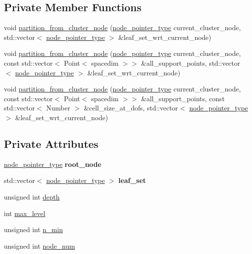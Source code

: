 \subsection*{Private Member Functions}
\begin{DoxyCompactItemize}
\item 
void \hyperlink{classClusterTree_a8b650f0c7cc83adbde5aad9556a57ac3}{partition\+\_\+from\+\_\+cluster\+\_\+node} (\hyperlink{classClusterTree_ae4bb0fdc7ac559d7844d04a00ab3e9de}{node\+\_\+pointer\+\_\+type} current\+\_\+cluster\+\_\+node, std\+::vector$<$ \hyperlink{classClusterTree_ae4bb0fdc7ac559d7844d04a00ab3e9de}{node\+\_\+pointer\+\_\+type} $>$ \&leaf\+\_\+set\+\_\+wrt\+\_\+current\+\_\+node)
\item 
void \hyperlink{classClusterTree_a6d3636b1686d72909611a6d516f5ee47}{partition\+\_\+from\+\_\+cluster\+\_\+node} (\hyperlink{classClusterTree_ae4bb0fdc7ac559d7844d04a00ab3e9de}{node\+\_\+pointer\+\_\+type} current\+\_\+cluster\+\_\+node, const std\+::vector$<$ Point$<$ spacedim $>$$>$ \&all\+\_\+support\+\_\+points, std\+::vector$<$ \hyperlink{classClusterTree_ae4bb0fdc7ac559d7844d04a00ab3e9de}{node\+\_\+pointer\+\_\+type} $>$ \&leaf\+\_\+set\+\_\+wrt\+\_\+current\+\_\+node)
\item 
void \hyperlink{classClusterTree_a8b853c36834044df5283fca9e03d39d2}{partition\+\_\+from\+\_\+cluster\+\_\+node} (\hyperlink{classClusterTree_ae4bb0fdc7ac559d7844d04a00ab3e9de}{node\+\_\+pointer\+\_\+type} current\+\_\+cluster\+\_\+node, const std\+::vector$<$ Point$<$ spacedim $>$$>$ \&all\+\_\+support\+\_\+points, const std\+::vector$<$ Number $>$ \&cell\+\_\+size\+\_\+at\+\_\+dofs, std\+::vector$<$ \hyperlink{classClusterTree_ae4bb0fdc7ac559d7844d04a00ab3e9de}{node\+\_\+pointer\+\_\+type} $>$ \&leaf\+\_\+set\+\_\+wrt\+\_\+current\+\_\+node)
\end{DoxyCompactItemize}
\subsection*{Private Attributes}
\begin{DoxyCompactItemize}
\item 
\mbox{\label{classClusterTree_a47a5916039b17a75cda800520ac130b6}} 
\hyperlink{classClusterTree_ae4bb0fdc7ac559d7844d04a00ab3e9de}{node\+\_\+pointer\+\_\+type} {\bfseries root\+\_\+node}
\item 
\mbox{\label{classClusterTree_aa53275a95d4085912bde71f85ef39067}} 
std\+::vector$<$ \hyperlink{classClusterTree_ae4bb0fdc7ac559d7844d04a00ab3e9de}{node\+\_\+pointer\+\_\+type} $>$ {\bfseries leaf\+\_\+set}
\item 
unsigned int \hyperlink{classClusterTree_a051df20340ed3f0e4bc0ee1fb1119f9f}{depth}
\item 
int \hyperlink{classClusterTree_a77800bb9f86c689821ba4d549ce97a58}{max\+\_\+level}
\item 
unsigned int \hyperlink{classClusterTree_a5af4448800c4ddc98121706754bfe3f9}{n\+\_\+min}
\item 
unsigned int \hyperlink{classClusterTree_a6b352489be3ca9217d31966c24ee02a1}{node\+\_\+num}
\end{DoxyCompactItemize}
